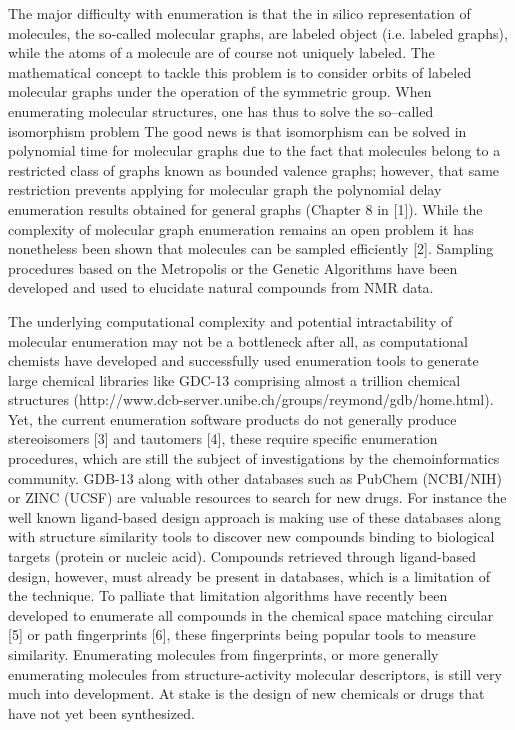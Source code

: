 \documentclass{sig-alternate}
\begin{document}
The major difficulty with enumeration is that the in silico representation of
molecules, the so-called molecular graphs, are labeled object (i.e. labeled
graphs), while the atoms of a molecule are of course not uniquely labeled. The
mathematical concept to tackle this problem is to consider orbits of labeled
molecular graphs under the operation of the symmetric group. When enumerating
molecular structures, one has thus to solve the so–called isomorphism problem
The good news is that isomorphism can be solved in polynomial time for molecular
graphs due to the fact that molecules belong to a restricted class of graphs
known as bounded valence graphs; however, that same restriction prevents
applying for molecular graph the polynomial delay enumeration results obtained
for general graphs (Chapter 8 in [1]). While the complexity of molecular graph
enumeration remains an open problem it has nonetheless been shown that molecules
can be sampled efficiently [2]. Sampling procedures based on the Metropolis or
the Genetic Algorithms have been developed and used to elucidate natural
compounds from NMR data.
 
The underlying computational complexity and potential intractability of
molecular enumeration may not be a bottleneck after all, as computational
chemists have developed and successfully used enumeration tools to generate
large chemical libraries like GDC-13 comprising almost a trillion chemical
structures (http://www.dcb-server.unibe.ch/groups/reymond/gdb/home.html). Yet,
the current enumeration software products do not generally produce stereoisomers
[3] and tautomers [4], these require specific enumeration procedures, which are
still the subject of investigations by the chemoinformatics community. GDB-13
along with other databases such as PubChem (NCBI/NIH) or ZINC (UCSF) are
valuable resources to search for new drugs. For instance the well known
ligand-based design approach is making use of these databases along with
structure similarity tools to discover new compounds binding to biological
targets (protein or nucleic acid). Compounds retrieved through ligand-based
design, however, must already be present in databases, which is a limitation of
the technique. To palliate that limitation algorithms have recently been
developed to enumerate all compounds in the chemical space matching circular [5]
or path fingerprints [6], these fingerprints being popular tools to measure
similarity. Enumerating molecules from fingerprints, or more generally
enumerating molecules from structure-activity molecular descriptors, is still
very much into development. At stake is the design of new chemicals or drugs
that have not yet been synthesized.
 
\end{document}
